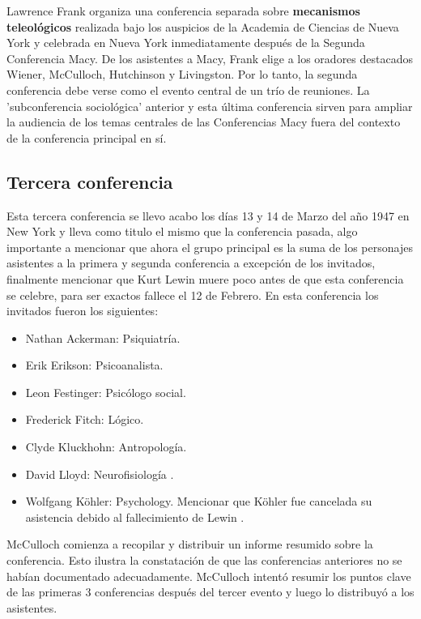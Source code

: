\documentclass[11pt]{article}
\begin{document}
		Lawrence Frank organiza una conferencia separada sobre \textbf{mecanismos teleológicos} realizada bajo los auspicios de la Academia de Ciencias de Nueva York y celebrada en Nueva York inmediatamente después de la Segunda Conferencia Macy. De los asistentes a Macy, Frank elige a los oradores destacados Wiener, McCulloch, Hutchinson y Livingston. Por lo tanto, la segunda conferencia debe verse como el evento central de un trío de reuniones. La 'subconferencia sociológica' anterior y esta última conferencia sirven para ampliar la audiencia de los temas centrales de las Conferencias Macy fuera del contexto de la conferencia principal en sí.\par
		\subsection{Tercera conferencia}
		Esta tercera conferencia se llevo acabo los días 13 y 14 de Marzo del año 1947 en New York y lleva como titulo el mismo que la conferencia pasada, algo importante a mencionar que ahora el grupo principal es la suma de los personajes asistentes a la primera y segunda conferencia a excepción de los invitados, finalmente mencionar que Kurt Lewin muere poco antes de que esta conferencia se celebre, para ser exactos fallece el 12 de Febrero. En esta conferencia los invitados fueron los siguientes:
		\begin{itemize}
    		\item Nathan Ackerman: Psiquiatría.
    		\item Erik Erikson: Psicoanalista.
    		\item Leon Festinger: Psicólogo social.
			\item Frederick Fitch: Lógico.
			\item Clyde Kluckhohn: Antropología.
			\item David Lloyd: Neurofisiología .
			\item Wolfgang Köhler: Psychology. Mencionar que Köhler fue cancelada su asistencia debido al fallecimiento de Lewin .
		\end{itemize}

		McCulloch comienza a recopilar y distribuir un informe resumido sobre la conferencia. Esto ilustra la constatación de que las conferencias anteriores no se habían documentado adecuadamente. McCulloch intentó resumir los puntos clave de las primeras 3 conferencias después del tercer evento y luego lo distribuyó a los asistentes.\par
 
\end{document}
